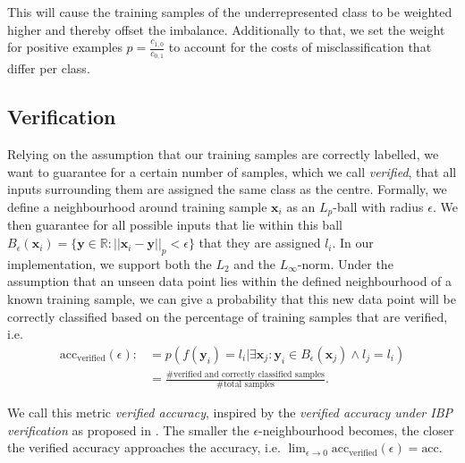 \documentclass[acmsmall,nonacm]{acmart}
\begin{document}
This will cause the training samples of the underrepresented class to be weighted higher and thereby offset the imbalance. Additionally to that, we set the weight for positive examples $p = \frac{c_{1,0}}{c_{0,1}}$ to account for the costs of misclassification that differ per class. 

\subsection{Verification} \label{ssec:verification}

Relying on the assumption that our training samples are correctly labelled, we want to guarantee for a certain number of samples, which we call \textit{verified}, that all inputs surrounding them are assigned the same class as the centre. Formally, we define a neighbourhood around training sample $\mathbf{x}_i$ as an $L_p$-ball with radius $\epsilon$. We then guarantee for all possible inputs that lie within this ball $B_\epsilon(\mathbf{x}_i) = \{\mathbf{y} \in \mathbb{R}: ||\mathbf{x}_i - \mathbf{y}||_p < \epsilon \}$ that they are assigned $l_i$. In our implementation, we support both the $L_2$ and the $L_\infty$-norm. Under the assumption that an unseen data point lies within the defined neighbourhood of a known training sample, we can give a probability that this new data point will be correctly classified based on the percentage of training samples that are verified, i.e.
\begin{align}
	\text{acc}_\text{verified}(\epsilon) :&= p(f(\mathbf{y}_i) = l_i | \exists \mathbf{x}_j : \mathbf{y}_i \in B_{\epsilon} (\mathbf{x}_j) \land l_j = l_i ) \\
	&= \frac{\text{\# verified and correctly classified samples}}{\text{\# total samples}}.
\end{align} %

We call this metric \textit{verified accuracy}, inspired by the \textit{verified accuracy under IBP verification} as proposed in \cite{huang2019achieving}. The smaller the $\epsilon$-neighbourhood becomes, the closer the verified accuracy approaches the accuracy, i.e. $\lim_{\epsilon \to 0} \text{acc}_{\text{verified}} (\epsilon) = \text{acc}$.

\end{document}

